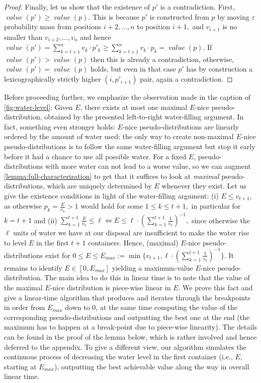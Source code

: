 \documentclass[sigconf,nonacm]{aamas}
\DeclareMathOperator{\valueText}{\textit{value}}
\newcommand{\val}[1]{\valueText({#1})}
\begin{document}
\begin{proof}
Finally, let us show that the existence of $p'$ is a contradiction. First, $\val{p'} \geq \val{p}.$ This is because $p'$ is constructed from $p$ by moving $\varepsilon$ probability mass from positions $i + 2, \dots, n$ to position $i + 1,$ and $v_{i + 1}$ is no smaller than $v_{i + 2}, \dots, v_n$ and hence $\val{p'} = \sum_{k = t + 1}^{n} v_k \cdot p'_k \geq \sum_{k = t + 1}^{n} v_k \cdot p_k = \val{p}.$ If $\val{p'} > \val{p}$ then this is already a contradiction, otherwise, $\val{p'} = \val{p}$ holds, but even in that case $p'$ has by construction a lexicographically strictly higher $(i, p'_{i + 1})$ pair, again a contradiction.
\end{proof}

Before proceeding further, we emphasize the observation made in the caption of \cref{fig:water-level}: Given $E$, there exists at most one maximal $E$-nice pseudo-distribution, obtained by the presented left-to-right water-filling argument. In fact, something even stronger holds: $E$-nice pseudo-distributions are linearly ordered by the amount of water used: the only way to create non-maximal $E$-nice pseudo-distributions is to follow the same water-filling argument but stop it early before it had a chance to use all possible water. For a fixed $E$, pseudo-distributions with more water can not lead to a worse value, so we can augment \cref{lemma:full-characterization} to get that it suffices to look at \emph{maximal} pseudo-distributions, which are uniquely determined by $E$ whenever they exist. Let us give the existence conditions in light of the water-filling argument: (i) $E \leq v_{t + 1},$ as otherwise $p_k = \frac{E}{v_k} > 1$ would hold for some $1 \leq k \leq t + 1,$ in particular for $k = t + 1$
and (ii) $\sum_{k = 1}^{t + 1}\frac{E}{v_k} \leq \ell \iff E \leq \ell \cdot (\sum_{k = 1}^{t + 1}\frac{1}{v_k})^{-1},$ since otherwise the $\ell$ units of water we have at our disposal are insufficient to make the water rise to level $E$ in the first $t + 1$ containers. Hence, (maximal) $E$-nice pseudo-distributions exist for $0 \leq E \leq E_\mathit{max} := \min\{v_{t + 1}, \ell \cdot (\sum_{k = 1}^{t + 1}\frac{1}{v_k})^{-1}\}$. It remains to identify $E \in [0, E_\mathit{max}]$ yielding a maximum-value $E$-nice pseudo-distribution. The main idea to do this in linear time is to note that the value of the maximal $E$-nice distribution is piece-wise linear in $E$. We prove this fact and give a linear-time algorithm that produces and iterates through the breakpoints in order from $E_\mathit{max}$ down to $0$, at the same time computing the value of the corresponding pseudo-distributions and outputting the best one at the end (the maximum has to happen at a break-point due to piece-wise linearity). The details can be found in the proof of the lemma below, which is rather involved and hence deferred to the appendix. To give a different view, our algorithm simulates the continuous process of decreasing the water level in the first container (i.e., $E$, starting at $E_\mathit{max}$), outputting the best achievable value along the way in overall linear time. 
\end{document}
